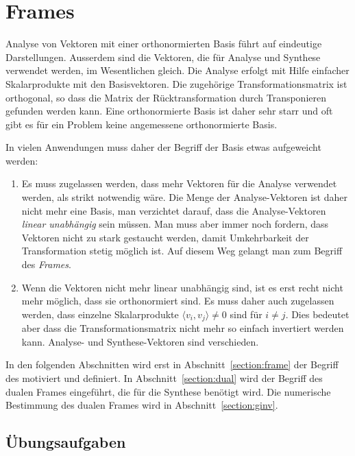 %
%
%
\chapter{Frames
\label{chapter:geometrie}}
Analyse von Vektoren mit einer orthonormierten Basis führt auf eindeutige
Darstellungen. 
Ausserdem sind die Vektoren, die für Analyse und Synthese verwendet
werden, im Wesentlichen gleich.
Die Analyse erfolgt mit Hilfe einfacher Skalarprodukte mit den Basisvektoren.
Die zugehörige Transformationsmatrix ist orthogonal, so dass die
Matrix der Rücktransformation durch Transponieren gefunden werden kann.
Eine orthonormierte Basis ist daher sehr starr und oft gibt es für ein
Problem keine angemessene orthonormierte Basis.

In vielen Anwendungen muss daher der Begriff der Basis etwas aufgeweicht
werden:
\begin{enumerate}
\item
Es muss zugelassen werden, dass mehr Vektoren für die Analyse verwendet
werden, als strikt notwendig wäre.
Die Menge der Analyse-Vektoren ist daher nicht mehr eine Basis, man
verzichtet darauf, dass die Analyse-Vektoren {\em linear unabhängig} sein
müssen.
Man muss aber immer noch fordern, dass Vektoren nicht zu stark gestaucht
werden, damit Umkehrbarkeit der Transformation stetig möglich ist.
Auf diesem Weg gelangt man zum Begriff des {\em Frames}.
\item
Wenn die Vektoren nicht mehr linear unabhängig sind, ist es erst
recht nicht mehr möglich, dass sie orthonormiert sind.
Es muss daher auch zugelassen werden, dass einzelne Skalarprodukte 
$\langle v_i,v_j\rangle\ne 0$ sind für $i\ne j$.
Dies bedeutet aber dass die Transformationsmatrix nicht mehr so einfach
invertiert werden kann.
Analyse- und Synthese-Vektoren sind verschieden.
\end{enumerate}
In den folgenden Abschnitten wird erst in Abschnitt~\ref{section:frame}
der Begriff des motiviert und definiert.
In Abschnitt~\ref{section:dual} wird der Begriff des dualen Frames
eingeführt, die für die Synthese benötigt wird.
Die numerische Bestimmung des dualen Frames wird in
Abschnitt~\ref{section:ginv}.







\section*{Übungsaufgaben}






